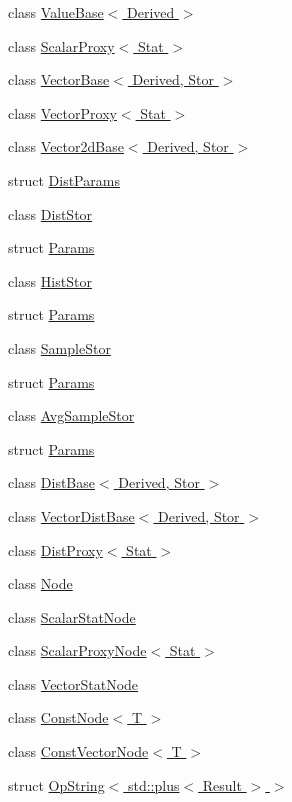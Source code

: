 \begin{DoxyCompactItemize}
class \hyperlink{classStats_1_1ValueBase}{ValueBase$<$ Derived $>$}
\item 
class \hyperlink{classStats_1_1ScalarProxy}{ScalarProxy$<$ Stat $>$}
\item 
class \hyperlink{classStats_1_1VectorBase}{VectorBase$<$ Derived, Stor $>$}
\item 
class \hyperlink{classStats_1_1VectorProxy}{VectorProxy$<$ Stat $>$}
\item 
class \hyperlink{classStats_1_1Vector2dBase}{Vector2dBase$<$ Derived, Stor $>$}
\item 
struct \hyperlink{structStats_1_1DistParams}{DistParams}
\item 
class \hyperlink{classStats_1_1DistStor}{DistStor}
\item 
struct \hyperlink{structStats_1_1DistStor_1_1Params}{Params}
\item 
class \hyperlink{classStats_1_1HistStor}{HistStor}
\item 
struct \hyperlink{structStats_1_1HistStor_1_1Params}{Params}
\item 
class \hyperlink{classStats_1_1SampleStor}{SampleStor}
\item 
struct \hyperlink{structStats_1_1SampleStor_1_1Params}{Params}
\item 
class \hyperlink{classStats_1_1AvgSampleStor}{AvgSampleStor}
\item 
struct \hyperlink{structStats_1_1AvgSampleStor_1_1Params}{Params}
\item 
class \hyperlink{classStats_1_1DistBase}{DistBase$<$ Derived, Stor $>$}
\item 
class \hyperlink{classStats_1_1VectorDistBase}{VectorDistBase$<$ Derived, Stor $>$}
\item 
class \hyperlink{classStats_1_1DistProxy}{DistProxy$<$ Stat $>$}
\item 
class \hyperlink{classStats_1_1Node}{Node}
\item 
class \hyperlink{classStats_1_1ScalarStatNode}{ScalarStatNode}
\item 
class \hyperlink{classStats_1_1ScalarProxyNode}{ScalarProxyNode$<$ Stat $>$}
\item 
class \hyperlink{classStats_1_1VectorStatNode}{VectorStatNode}
\item 
class \hyperlink{classStats_1_1ConstNode}{ConstNode$<$ T $>$}
\item 
class \hyperlink{classStats_1_1ConstVectorNode}{ConstVectorNode$<$ T $>$}
\item 
struct \hyperlink{structStats_1_1OpString_3_01std_1_1plus_3_01Result_01_4_01_4}{OpString$<$ std::plus$<$ Result $>$ $>$}

\end{DoxyCompactItemize}
